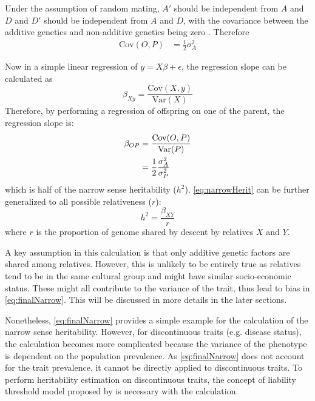 \documentclass[12pt]{scrbook}
\begin{document}
Under the assumption of random mating,  $A'$ should be independent from $A$ and $D$ and $D'$ should be independent from $A$ and $D$, with the covariance between the additive genetics and non-additive genetics being zero \citep{falconer1996introduction}.
Therefore
\begin{align}
\mathrm{Cov}(O,P) &= \frac{1}{2}\sigma_A^2
\label{eq:covOP}
\end{align}

Now in a simple linear regression of $y=X\beta+\epsilon$, the regression slope can be calculated as
\begin{equation}
\beta_{Xy}=\frac{\mathrm{Cov}(X,y)}{\mathrm{Var}(X)}
\end{equation}
Therefore, by performing a regression of offspring on one of the parent, the regression slope is:
\begin{align}
\beta_{OP} &= \frac{\mathrm{Cov}(O,P)}{\mathrm{Var}(P)}\notag\\
&=\frac{1}{2}\frac{\sigma_A^2}{\sigma_P^2}
\label{eq:narrowHerit}
\end{align}
which is half of the narrow sense heritability ($h^2$).
\cref{eq:narrowHerit} can be further generalized to all possible relativeness ($r$):
\begin{equation}
h^2=\frac{\beta_{XY}}{r}
\label{eq:finalNarrow}
\end{equation}
where $r$ is the proportion of genome shared by descent by relatives $X$ and $Y$.

A key assumption in this calculation is that only additive genetic factors are shared among relatives.
However, this is unlikely to be entirely true as relatives tend to be in the same cultural group and might have similar socio-economic status.
These might all contribute to the variance of the trait, thus lead to bias in \cref{eq:finalNarrow}.
This will be discussed in more details in the later sections.
	
Nonetheless, \cref{eq:finalNarrow} provides a simple example for the calculation of the narrow sense heritability.
However, for discontinuous traits (e.g. disease status), the calculation becomes more complicated because the variance of the phenotype is dependent on the population prevalence.
As \cref{eq:finalNarrow} does not account for the trait prevalence, it cannot be directly applied to discontinuous traits.
To perform heritability estimation on discontinuous traits, the concept of liability threshold model proposed by \cite{Falconer1965} is necessary with the calculation.
\end{document}

